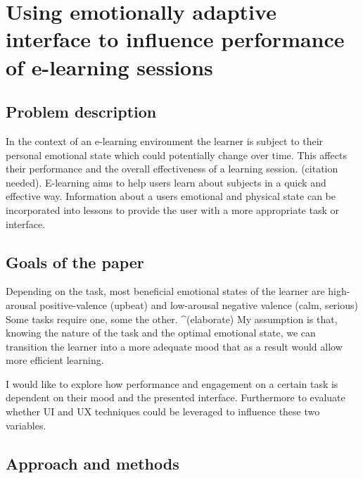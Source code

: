 

\pagebreak

\section {Using emotionally adaptive interface to influence performance of e-learning sessions}


\subsection{Problem description}

In the context of an e-learning environment the learner is subject to their personal emotional state which could potentially change over time. This affects their performance and the overall effectiveness of a learning session. (citation needed). E-learning aims to help users learn about subjects in a quick and effective way. Information about a users emotional and physical state can be incorporated into lessons to provide the user with a more appropriate task or interface.

\subsection{Goals of the paper}

Depending on the task, most beneficial emotional states of the learner are high-arousal positive-valence (upbeat) and low-arousal negative valence (calm, serious) \cite{NEEDED}
Some tasks require one, some the other. ^{(elaborate)}
My assumption is that, knowing the nature of the task and the optimal emotional state, we can transition the learner into a more adequate mood that as a result would allow more efficient learning.

I would like to explore how performance and engagement on a certain task is dependent on their mood and the presented interface.
Furthermore to evaluate whether UI and UX techniques could be leveraged to influence these two variables.


\subsection{Approach and methods}

